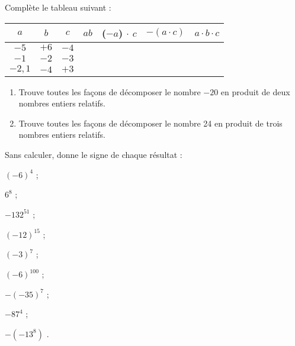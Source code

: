 \begin{exercice}
Complète le tableau suivant :
{\small
\begin{center}
\begin{tabular}{|c|c|c|c|c|c|c|}
\hline
\cellcolor{H2} $a$ & \cellcolor{H2} $b$ & \cellcolor{H2} $c$ & \cellcolor{A2} $ab$ &  \cellcolor{A2} ($-a$) $\cdot$ $c$ &  \cellcolor{A2} $-(a\cdot c)$ &  \cellcolor{A2} $a \cdot b \cdot c$ \\\hline 
\cellcolor{H3} $-5$ & \cellcolor{H3} $+6$ & \cellcolor{H3} $-4$ & \cellcolor{A3} & \cellcolor{A3} & \cellcolor{A3} & \cellcolor{A3} \\\hline
\cellcolor{H3} $-1$ & \cellcolor{H3} $-2$ & \cellcolor{H3} $-3$ & \cellcolor{A3} & \cellcolor{A3} & \cellcolor{A3} & \cellcolor{A3} \\\hline
\cellcolor{H3} $-2,1$ & \cellcolor{H3} $-4$ & \cellcolor{H3} $+3$ & \cellcolor{A3} & \cellcolor{A3} & \cellcolor{A3} & \cellcolor{A3} \\\hline
 \end{tabular}
 \end{center}
 } %
\end{exercice}


\begin{exercice}
\begin{enumerate}
 \item Trouve toutes les façons de décomposer le nombre $-20$ en produit de deux nombres entiers relatifs.
 \item Trouve toutes les façons de décomposer le nombre 24 en produit de trois nombres entiers relatifs.
 \end{enumerate}
\end{exercice}


\columnbreak

\begin{exercice}
Sans calculer, donne le signe de chaque résultat :
\begin{colenumerate}{3}
 \item $(-6)^{4}$   \dotfill;
 \item $6^{8}$  \dotfill;
 \item $-132^{51}$  \dotfill;
 \item $(-12)^{15}$  \dotfill;
 \item $(-3)^{7}$  \dotfill;
 \item $(-6)^{100}$  \dotfill;
 \item $-(-35)^{7}$  \dotfill;
 \item $-87^{4}$  \dotfill;
 \item $-(-13^{8})$ \dotfill.
 \end{colenumerate}
\end{exercice}


